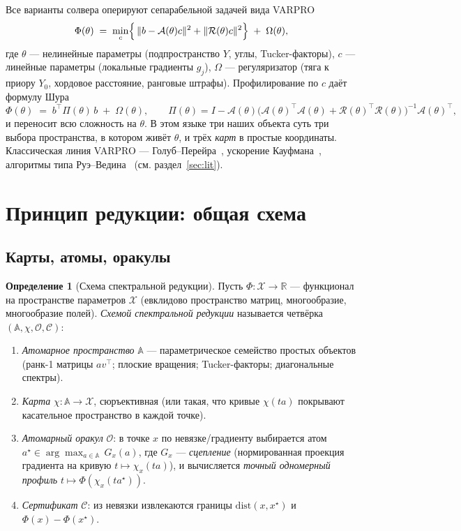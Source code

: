 \documentclass[11pt,a4paper]{article}
\newcommand{\R}{\mathbb{R}}
\newcommand{\Id}{I}
\newcommand{\T}{^{\!\top}}
\newcommand{\Aop}{\mathcal{A}}
\newcommand{\Rop}{\mathcal{R}}
\newcommand{\dist}{\mathrm{dist}}
\theoremstyle{plain}
\theoremstyle{definition}
\newtheorem{definition}[theorem]{Определение}
\theoremstyle{remark}
\begin{document}
Все варианты солвера оперируют сепарабельной задачей вида VARPRO
\begin{equation}\label{eq:master}
\Phi(\theta)\;=\;\min_{c}\Bigl\{\,\|b-\Aop(\theta)c\|^2+\|\Rop(\theta)c\|^2\Bigr\}\;+\;\Omega(\theta),
\end{equation}
где $\theta$ --- нелинейные параметры (подпространство $Y$, углы, Tucker-факторы),
$c$ --- линейные параметры (локальные градиенты $g_j$), $\Omega$ --- регуляризатор
(тяга к приору $Y_0$, хордовое расстояние, ранговые штрафы). Профилирование по $c$
даёт формулу Шура
\begin{equation}\label{eq:schur}
\Phi(\theta)\;=\;b\T\Pi(\theta)\,b\;+\;\Omega(\theta),\qquad
\Pi(\theta)=\Id-\Aop(\theta)\bigl(\Aop(\theta)\T\Aop(\theta)+\Rop(\theta)\T\Rop(\theta)\bigr)^{-1}\Aop(\theta)\T,
\end{equation}
и переносит всю сложность на $\theta$. В этом языке три наших объекта суть три
выбора пространства, в котором живёт $\theta$, и трёх \emph{карт} в простые
координаты. Классическая линия VARPRO --- Голуб--Перейра~\cite{golub-pereyra-1973},
ускорение Кауфмана~\cite{kaufman-1975}, алгоритмы типа Руэ--Ведина~\cite{ruhe-wedin-1980}
(см. раздел~\ref{sec:lit}).

\section{Принцип редукции: общая схема}\label{sec:principle}

\subsection{Карты, атомы, оракулы}

\begin{definition}[Схема спектральной редукции]\label{def:reduction}
Пусть $\Phi:\mathcal X\to\R$ --- функционал на пространстве параметров $\mathcal X$
(евклидово пространство матриц, многообразие, многообразие полей). \emph{Схемой
спектральной редукции} называется четвёрка $(\mathbb A,\chi,\mathcal O,\mathcal C)$:
\begin{enumerate}[label=(\roman*),leftmargin=2.2em]
\item \emph{Атомарное пространство} $\mathbb A$ --- параметрическое семейство
простых объектов (ранк-1 матрицы $av\T$; плоские вращения; Tucker-факторы;
диагональные спектры).
\item \emph{Карта} $\chi:\mathbb A\to\mathcal X$, сюръективная (или такая, что
кривые $\chi(ta)$ покрывают касательное пространство в каждой точке).
\item \emph{Атомарный оракул} $\mathcal O$: в точке $x$ по невязке/градиенту
выбирается атом $a^\star\in\arg\max_{a\in\mathbb A}\,G_x(a)$, где $G_x$ ---
\emph{сцепление} (нормированная проекция градиента на кривую $t\mapsto\chi_x(ta)$),
и вычисляется \emph{точный одномерный профиль} $t\mapsto\Phi(\chi_x(ta^\star))$.
\item \emph{Сертификат} $\mathcal C$: из невязки извлекаются границы
$\dist(x,x^\star)$ и $\Phi(x)-\Phi(x^\star)$.
\end{enumerate}
\end{definition}
\end{document}
